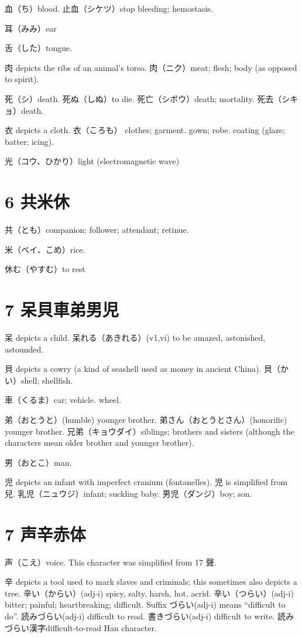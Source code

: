 血（ち）blood.
止血（シケツ）stop bleeding; hemostasis.

耳（みみ）ear

舌（した）tongue.

肉 depicts the ribs of an animal's torso.
肉（ニク）meat; flesh; body (as opposed to spirit).

死（シ）death.
死ぬ（しぬ）to die.
死亡（シボウ）death; mortality.
死去（シキョ）death.

衣 depicts a cloth.
衣（ころも）
clothes;
garment. gown;
robe. coating (glaze; batter; icing).

光（コウ、ひかり）light (electromagnetic wave)

\section{6 共米休}

共（とも）companion; follower; attendant; retinue.

米（ベイ、こめ）rice.

休む（やすむ）to rest

\section{7 呆貝車弟男児}

呆 depicts a child.
呆れる（あきれる）(v1,vi) to be amazed, astonished, astounded.

貝 depicts a cowry (a kind of seashell used as money in ancient China).
貝（かい）shell; shellfish.

車（くるま）car; vehicle. wheel.

弟（おとうと）(humble) younger brother.
弟さん（おとうとさん）(honorific) younger brother.
兄弟（キョウダイ）siblings;
brothers and sisters
(although the characters mean older brother and younger brother).

男（おとこ）man.

児 depicts an infant with imperfect cranium (fontanelles).
児 is simplified from 兒.
乳児（ニュウジ）infant; suckling baby.
男児（ダンジ）boy; son.

\section{7 声辛赤体}

声（こえ）voice.
This character was simplified from 17 聲.

辛 depicts a tool used to mark slaves and criminals;
this sometimes also depicts a tree.
辛い（からい）(adj-i) spicy, salty, harsh, hot, acrid.
辛い（つらい）(adj-i) bitter; painful; heartbreaking; difficult.
Suffix づらい(adj-i) means ``difficult to do''.
読みづらい(adj-i) difficult to read.
書きづらい(adj-i) difficult to write.
読みづらい漢字difficult-to-read Han character.


